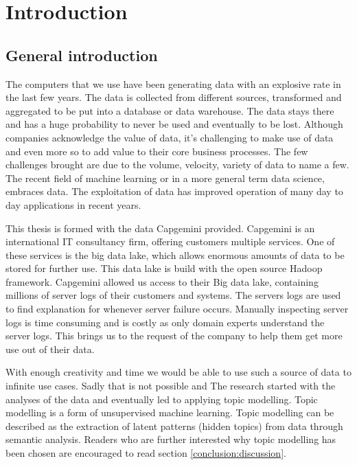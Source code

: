 \chapter{Introduction} \label{ch:introduction}

\section{General introduction}\label{introduction:Generalinformation}
The computers that we use have been generating data with an explosive rate in the last few years. The data is collected from different sources, transformed and aggregated to be put into a database or data warehouse. The data stays there and has a huge probability to never be used and eventually to be lost. Although companies acknowledge the value of data, it's challenging to make use of data and even more so to add value to their core business processes. The few challenges brought are due to the volume, velocity, variety of data to name a few. The recent field of machine learning or in a more general term data science, embraces data. The exploitation of data has improved operation of many day to day applications in recent years. 

\setlength{\parindent}{3ex} This thesis is formed with the data Capgemini provided. Capgemini is an international IT consultancy firm, offering customers multiple services. One of these services is the big data lake, which allows enormous amounts of data to be stored for further use. This data lake is build with the open source Hadoop framework. Capgemini allowed us access to their Big data lake, containing millions of server logs of their customers and systems. The servers logs are used to find explanation for whenever server failure occurs. Manually inspecting server logs is time consuming and is costly as only domain experts understand the server logs. This brings us to the request of the company to help them get more use out of their data. 

With enough creativity and time we would be able to use such a source of data to infinite use cases. Sadly that is not possible and The research started with the analyses of the data and eventually led to applying topic modelling. Topic modelling is a form of unsupervised machine learning. Topic modelling can be described as the extraction of latent patterns (hidden topics) from data through semantic analysis. Readers who are further interested why topic modelling has been chosen are encouraged to read section \ref{conclusion:discussion}. 

